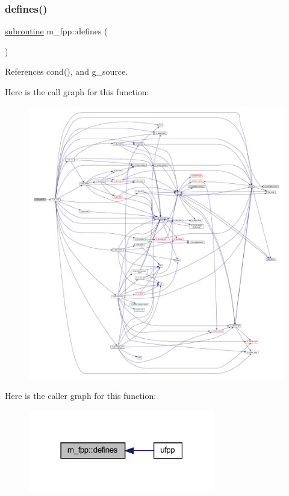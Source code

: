 \subsubsection{\texorpdfstring{defines()}{defines()}}
{\footnotesize\ttfamily \hyperlink{M__stopwatch_83_8txt_acfbcff50169d691ff02d4a123ed70482}{subroutine} m\+\_\+fpp\+::defines (\begin{DoxyParamCaption}{ }\end{DoxyParamCaption})}



References cond(), and g\+\_\+source.

Here is the call graph for this function\+:
\nopagebreak
\begin{figure}[H]
\begin{center}
\leavevmode
\includegraphics[width=350pt]{namespacem__fpp_a1db94413ac57479277fa9a5528ea3c26_cgraph}
\end{center}
\end{figure}
Here is the caller graph for this function\+:
\nopagebreak
\begin{figure}[H]
\begin{center}
\leavevmode
\includegraphics[width=231pt]{namespacem__fpp_a1db94413ac57479277fa9a5528ea3c26_icgraph}
\end{center}
\end{figure}
\mbox{\label{namespacem__fpp_a36ad74639f1f01dd0ac08e59e6943778}} 

